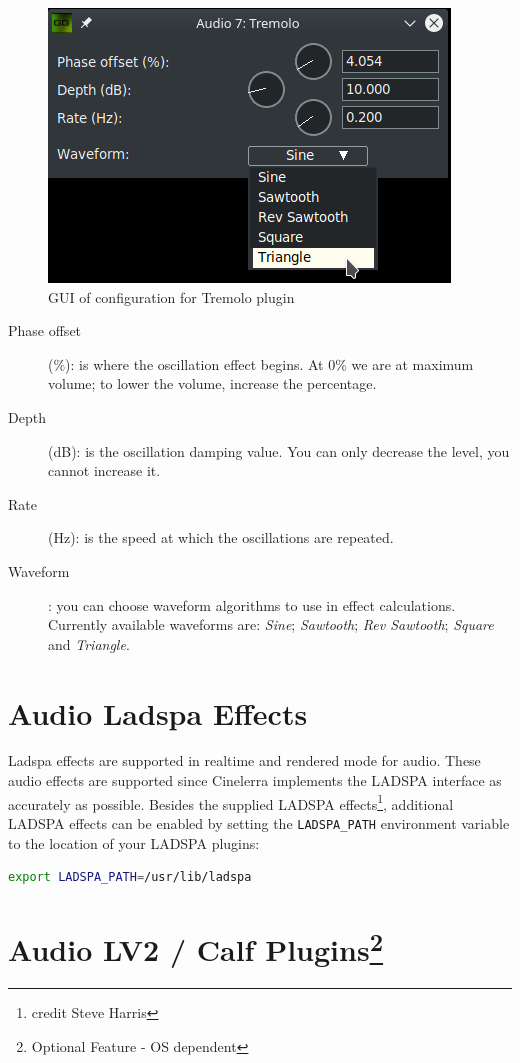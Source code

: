 \begin{figure}[htpb]
	\centering
	\includegraphics[width=0.5\linewidth]{images/tremolo.png}
	\caption{GUI of configuration for Tremolo plugin}
	\label{fig:tremolo}
\end{figure}

\begin{description}
	\item[Phase offset] (\%): is where the oscillation effect begins. At 0\% we are at maximum volume; to lower the volume, increase the percentage.
	\item[Depth] (dB): is the oscillation damping value. You can only decrease the level, you cannot increase it.
	\item[Rate] (Hz): is the speed at which the oscillations are repeated.
	\item[Waveform]: you can choose waveform algorithms to use in effect calculations.
Currently available waveforms are: \textit{Sine}; \textit{Sawtooth}; \textit{Rev Sawtooth}; \textit{Square} and \textit{Triangle}.
\end{description}

\section{Audio Ladspa Effects}%
\label{sec:audio_ladspa_effects}

Ladspa effects are supported in realtime and rendered mode for audio. These audio effects are supported since Cinelerra implements the LADSPA interface as accurately as possible. Besides the supplied LADSPA effects\protect\footnote{credit Steve Harris}, additional LADSPA effects can be enabled by setting the \texttt{LADSPA\_PATH} environment variable to the location of your LADSPA plugins:

\begin{lstlisting}[language=Bash,numbers=none]
export LADSPA_PATH=/usr/lib/ladspa
\end{lstlisting}

\section[Audio LV2 / Calf Plugins]{Audio LV2 / Calf Plugins\protect\footnote{Optional Feature - OS dependent}}%
\label{sec:audio_lv2_calf_plugins}

